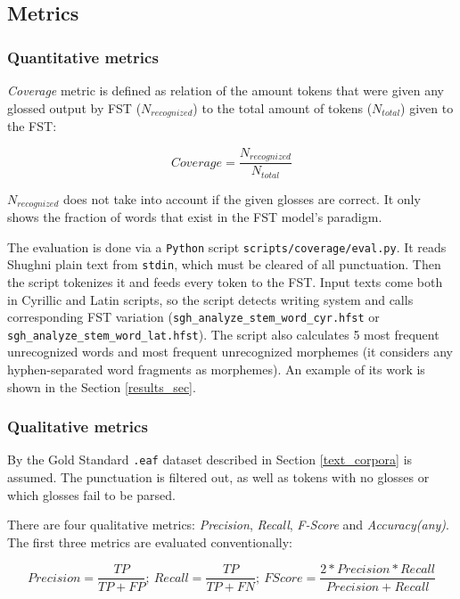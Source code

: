 \subsection{Metrics} \label{metrics_section}
\subsubsection{Quantitative metrics}
\textit{Coverage} metric is defined as relation of the amount tokens that were given any glossed output by FST ($N_{recognized}$) to the total amount of tokens ($N_{total}$) given to the FST:

\[Coverage = \frac{N_{recognized}}{N_{total}}\]

$N_{recognized}$ does not take into account if the given glosses are correct. It only shows the fraction of words that exist in the FST model's paradigm. 

The evaluation is done via a \texttt{Python} script \texttt{scripts/coverage/eval.py}. It reads Shughni plain text from \texttt{stdin}, which must be cleared of all punctuation. Then the script tokenizes it and feeds every token to the FST. Input texts come both in Cyrillic and Latin scripts, so the script detects writing system and calls corresponding FST variation (\texttt{sgh\_analyze\_stem\_word\_cyr.hfst} or \texttt{sgh\_analyze\_stem\_word\_lat.hfst}). The script also calculates 5 most frequent unrecognized words and most frequent unrecognized morphemes (it considers any hyphen-separated word fragments as morphemes). An example of its work is shown in the Section \ref{results_sec}.

\subsubsection{Qualitative metrics}
By the Gold Standard \texttt{.eaf} dataset described in Section \ref{text_corpora} is assumed. The punctuation is filtered out, as well as tokens with no glosses or which glosses fail to be parsed.

There are four qualitative metrics: \textit{Precision}, \textit{Recall}, \textit{F-Score} and \textit{Accuracy(any)}. The first three metrics are evaluated conventionally:

\[Precision = \frac{TP}{TP + FP};\ 
Recall = \frac{TP}{TP + FN};\ 
FScore = \frac{2*Precision*Recall}{Precision + Recall}\]

